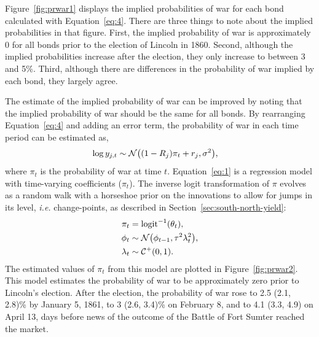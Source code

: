 \documentclass[]{article}\usepackage[]{graphicx}\usepackage[]{color}
\begin{document}
Figure~\ref{fig:prwar1} displays the implied probabilities of war for each bond calculated with Equation~\eqref{eq:4}.
There are three things to note about the implied probabilities in that figure.
First, the implied probability of war is approximately 0 for all bonds prior to the election of Lincoln in 1860.
Second, although the implied probabilities increase after the election, they only increase to between 3 and 5\%.
Third, although there are differences in the probability of war implied by each bond, they largely agree.

The estimate of the implied probability of war can be improved by noting that the implied probability of war should be the same for all bonds.
By rearranging Equation~\eqref{eq:4} and adding an error term, the probability of war in each time period can be estimated as,
\begin{align}
  \label{eq:1}
  \log y_{j,t} & \sim \mathcal{N}\mathopen{}\left((1 - R_{j}) \pi_{t} + r_{j}, \sigma^{2}\right)\mathclose{} \text{,}
\end{align}
where $\pi_{t}$ is the probability of war at time $t$.
Equation~\eqref{eq:1} is a regression model with time-varying coefficients ($\pi_{t}$).
The inverse logit transformation of $\pi$ evolves as a random walk with a horseshoe prior on the innovations to allow for jumps in its level, \textit{i.e.} change-points, as described in Section~\ref{sec:south-north-yield}:
\begin{align}
  \pi_{t} &= \operatorname{logit}^{-1}(\theta_{t}) \text{,} \\
  \phi_{t} &\sim \mathcal{N}\mathopen{}\left(\phi_{t-1}, \tau^{2} \lambda_{t}^{2}\right)\mathclose{} \text{,} \\
  \lambda_{t} &\sim \mathcal{C^+}\mathopen{}\left(0, 1\right)\mathclose{} \text{.}
\end{align}
The estimated values of $\pi_{t}$ from this model are plotted in Figure~\ref{fig:prwar2}.
This model estimates the probability of war to be approximately zero prior to Lincoln's election.
After the election, the probability of war rose to 2.5 (2.1, 2.8)\% by January 5, 1861,
to 3 (2.6, 3.4)\% on February 8, and to 4.1 (3.3, 4.9) on April 13, days before news of the outcome of the Battle of Fort Sumter reached the market.
\end{document}
